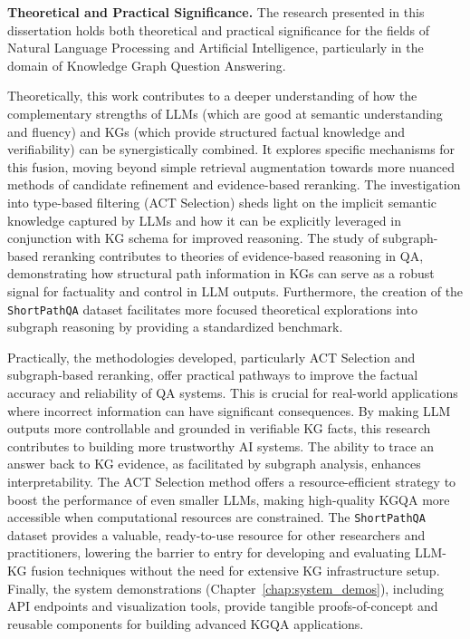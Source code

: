 \textbf{Theoretical and Practical Significance.}
The research presented in this dissertation holds both theoretical and practical significance for the fields of Natural Language Processing and Artificial Intelligence, particularly in the domain of Knowledge Graph Question Answering.

Theoretically, this work contributes to a deeper understanding of how the complementary strengths of LLMs (which are good at semantic understanding and fluency) and KGs (which provide structured factual knowledge and verifiability) can be synergistically combined. It explores specific mechanisms for this fusion, moving beyond simple retrieval augmentation towards more nuanced methods of candidate refinement and evidence-based reranking. The investigation into type-based filtering (ACT Selection) sheds light on the implicit semantic knowledge captured by LLMs and how it can be explicitly leveraged in conjunction with KG schema for improved reasoning. The study of subgraph-based reranking contributes to theories of evidence-based reasoning in QA, demonstrating how structural path information in KGs can serve as a robust signal for factuality and control in LLM outputs. Furthermore, the creation of the \texttt{ShortPathQA} dataset facilitates more focused theoretical explorations into subgraph reasoning by providing a standardized benchmark.

Practically, the methodologies developed, particularly ACT Selection and subgraph-based reranking, offer practical pathways to improve the factual accuracy and reliability of QA systems. This is crucial for real-world applications where incorrect information can have significant consequences. By making LLM outputs more controllable and grounded in verifiable KG facts, this research contributes to building more trustworthy AI systems. The ability to trace an answer back to KG evidence, as facilitated by subgraph analysis, enhances interpretability. The ACT Selection method offers a resource-efficient strategy to boost the performance of even smaller LLMs, making high-quality KGQA more accessible when computational resources are constrained. The \texttt{ShortPathQA} dataset provides a valuable, ready-to-use resource for other researchers and practitioners, lowering the barrier to entry for developing and evaluating LLM-KG fusion techniques without the need for extensive KG infrastructure setup. Finally, the system demonstrations (Chapter~\ref{chap:system_demos}), including API endpoints and visualization tools, provide tangible proofs-of-concept and reusable components for building advanced KGQA applications.

